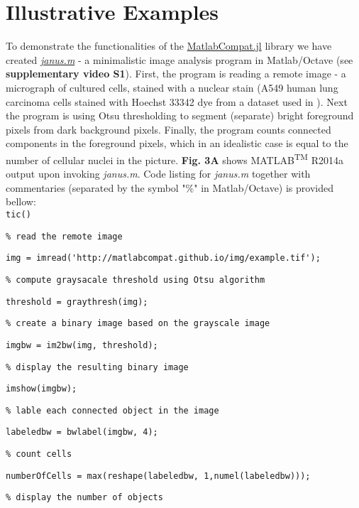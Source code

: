 \section{Illustrative Examples}

To demonstrate the functionalities of the \href{https://github.com/MatlabCompat/MatlabCompat.jl}{MatlabCompat.jl} library we have created \textit{\textit{\href{https://github.com/MatlabCompat/MatlabCompat.jl/blob/master/test/janus.m}{janus.m}}} - a minimalistic image analysis program in Matlab/Octave (see \textbf{supplementary video S1}). First, the program is reading a remote image - a micrograph of cultured cells, stained with a nuclear stain (A549 human lung carcinoma cells stained with Hoechst 33342 dye from a dataset used in \cite{22787215}). Next the program is using Otsu \cite{otsu1975threshold} thresholding to segment (separate) bright foreground pixels from dark background pixels. Finally, the program counts connected components in the foreground pixels, which in an idealistic case is equal to the number of cellular nuclei in the picture. \textbf{Fig. 3A} shows MATLAB\textsuperscript{TM} R2014a output upon invoking \textit{janus.m}. Code listing for \textit{janus.m} together with commentaries (separated by the symbol "\%" in Matlab/Octave) is provided bellow:\\



\verb|tic()|

\verb|% read the remote image|

\verb|img = imread('http://matlabcompat.github.io/img/example.tif');|

\verb|% compute graysacale threshold using Otsu algorithm|

\verb|threshold = graythresh(img);|

\verb|% create a binary image based on the grayscale image|

\verb|imgbw = im2bw(img, threshold);|

\verb|% display the resulting binary image|

\verb|imshow(imgbw);|

\verb|% lable each connected object in the image|

\verb|labeledbw = bwlabel(imgbw, 4);|

\verb|% count cells|

\verb|numberOfCells = max(reshape(labeledbw, 1,numel(labeledbw)));|

\verb|% display the number of objects|

